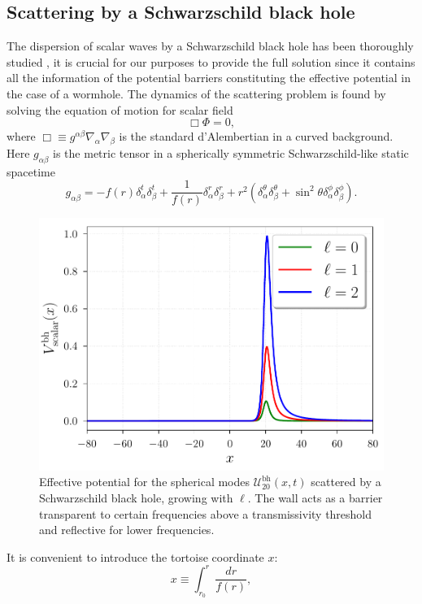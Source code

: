 \documentclass[article,aps,nofootinbib,twocolumn,superscriptaddress]{revtex4-1}
\begin{document}
\subsection{Scattering by a Schwarzschild black hole}
The dispersion of scalar waves by a Schwarzschild black hole has been thoroughly studied \citep{doi:10.1063/1.522949, Sanchez:1976xm, Sanchez:1977si, Sanchez:1977vz}, it is crucial for our purposes to provide the full solution since it contains all the information of the potential barriers constituting the effective potential in the case of a wormhole. The dynamics of the scattering problem is found by solving the equation of motion for scalar field
\begin{equation}
\Box\Phi=0,\label{eq:scalar_eq_mov} 
\end{equation}
where $\Box\equiv g^{\alpha\beta}\nabla_{\alpha}\nabla_{\beta}$ is the standard d'Alembertian in a curved background. Here $g_{\alpha\beta}$ is the metric tensor in a spherically symmetric Schwarzschild-like static spacetime
\begin{equation}
g_{\alpha\beta}=-f(r)\delta^t_{\alpha}\delta^t_{\beta}+\frac{1}{f(r)}\delta^r_{\alpha}\delta^r_{\beta}+r^2\left(\delta^{\theta}_{\alpha}\delta^{\theta}_{\beta}+\sin^2\theta\delta^{\phi}_{\alpha}\delta^{\phi}_{\beta}\right).
\label{eq:Schwarzschild}
\end{equation}
\begin{figure}[t]
\centering
\includegraphics[width=.45\textwidth]{figures/potential_scalar_bh.pdf}
\caption{\label{fig:Potential_BH} Effective potential for the spherical modes $\mathcal{U}^{\mathrm{bh}}_{20}(x,t)$ scattered by a Schwarzschild black hole, growing with $\ell$. The wall acts as a barrier transparent to certain frequencies above a transmissivity threshold and reflective for lower frequencies.}
\end{figure}
It is convenient to introduce the tortoise coordinate $x$:
\begin{equation}
x\equiv\displaystyle{\int_{r_0}^r\frac{dr}{f(r)}},
\label{eq:tortoise}
\end{equation} 
\end{document}
